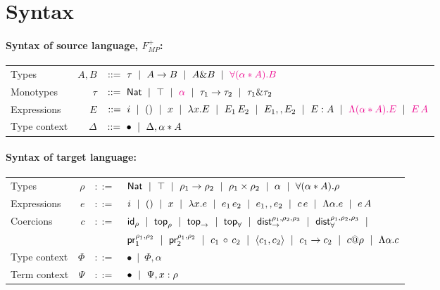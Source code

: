 \documentclass{article}
\newcommand{\mypar}[1]{\vspace{0.2cm}\paragraph{#1:} \hfill\vspace{0.1cm}}
\begin{document}
\section{Syntax}
\mypar{Syntax of source language, $F_{MP}^{+}$}
\noindent\begin{tabular}{l r l}
    Types        & $A, B$   & $::=~\tau~\mid~A \to B~\mid~A \& B~\mid~\textcolor{magenta}{\forall(\alpha\ast A).B}$\vspace{0.3cm}\\
    Monotypes    & $\tau$   & $::=~\mathsf{Nat}~\mid~\top~\mid~\textcolor{magenta}{\alpha}~\mid~\tau_1\to\tau_2~\mid~\tau_1\&\tau_2$ \vspace{0.3cm}\\
    Expressions  & $E$      & $::=~i~\mid~()~\mid~x~\mid~\lambda x.E~\mid~E_1\,E_2~\mid~E_1,,E_2~\mid~E : A~\mid~\textcolor{magenta}{\Lambda(\alpha\ast A).E}~\mid~\textcolor{magenta}{E\,A}$\vspace{0.3cm}\\
    Type context & $\Delta$ & $::=~\bullet~\mid~\Delta,\alpha\ast A$
  \end{tabular}

\mypar{Syntax of target language}
\noindent\begin{tabular}{l r r l}
    Types        & $\rho$   & $::=~$ & $\mathsf{Nat}~\mid~\top~\mid~ \rho_1 \to \rho_2~\mid~\rho_1 \times \rho_2~\mid~\alpha~\mid~\forall(\alpha\ast A).\rho$ \vspace{0.3cm}\\
    Expressions  & $e$      & $::=~$ & $i~\mid~()~\mid~x~\mid~\lambda x.e~\mid~e_1\,e_2~\mid~e_1 , , e_2~\mid~c\,e~\mid~\Lambda{\alpha}.{e}~\mid~e\,A$ \vspace{0.3cm}\\
    Coercions    & $c$      & $::=~$ & $\mathsf{id}_{\rho}~\mid~\mathsf{top}_{\rho}~\mid~\mathsf{top}_{\mathsf\to}~\mid~\mathsf{top}_{\mathsf\forall}~\mid~\mathsf{dist}_{\to}^{\rho_1,\rho_2,\rho_3}~\mid~\mathsf{dist}_{\forall}^{\rho_1,\rho_2,\rho_3}~\mid$\vspace{0.1cm}\\
                 &          & & $\mathsf{pr}_{\mathsf{1}}^{\rho_1,\rho_2}~\mid~\mathsf{pr}_{\mathsf{2}}^{\rho_1,\rho_2}~\mid~c_1\,\circ\, c_2~\mid~\langle c_1, c_2\rangle~\mid~c_1\to c_2~\mid~c @ \rho~\mid~\Lambda \alpha.c$\vspace{0.3cm}\\
    Type context & $\Phi$   & $::=~$ & $\bullet~\mid~\Phi,\alpha$\vspace{0.1cm}\\
    Term context & $\Psi$   & $::=~$ & $\bullet~\mid~\Psi,{x}:{\rho}$
  \end{tabular}
\end{document}
